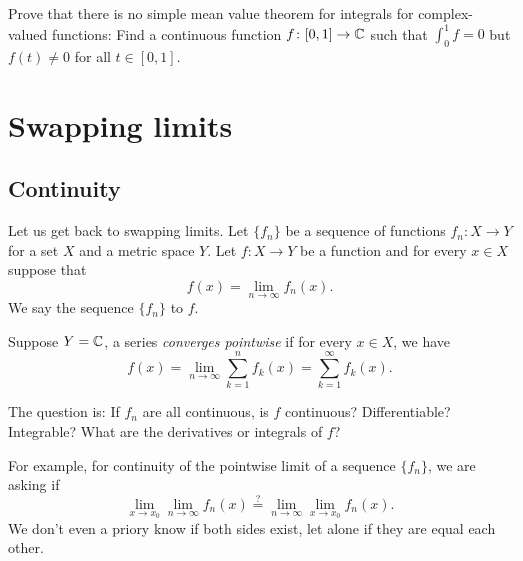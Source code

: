\begin{exercise}
Prove that there is no simple mean value theorem for integrals
for complex-valued
functions:  Find a continuous function $f \colon [0,1] \to {\mathbb{C}}$ such that
$\int_0^1 f = 0$ but $f(t) \not= 0$ for all $t \in [0,1]$.
\end{exercise}



\sectionnewpage
\section{Swapping limits}
\label{sec:swaplim}


\subsection{Continuity}

Let us get back to swapping limits.  Let $\{ f_n \}$ be a sequence
of functions $f_n \colon X \to Y$ for a set $X$ and a metric space $Y$.
Let $f \colon X \to Y$ be a
function and for every $x \in X$ suppose that
\begin{equation*}
f(x) = \lim_{n\to \infty} f_n(x) .
\end{equation*}
We say the sequence $\{ f_n \}$
\emph{} to $f$.

Suppose $Y={\mathbb{C}}$, a series
\emph{converges pointwise} if
for every $x \in X$, we have
\begin{equation*}
f(x) = \lim_{n\to \infty} \sum_{k=1}^n f_k(x) =
\sum_{k=1}^\infty f_k(x) .
\end{equation*}

\medskip

The question is:
If $f_n$ are all continuous, is $f$ continuous?  Differentiable?
Integrable?  What are the derivatives or integrals of $f$?

For example, for continuity of the pointwise limit of a sequence $\{ f_n
\}$, we are asking if
\begin{equation*}
\lim_{x\to x_0} \lim_{n\to\infty} f_n(x)
\overset{?}{=}
\lim_{n\to\infty} \lim_{x\to x_0} f_n(x) .
\end{equation*}
We don't even a priory know if both sides exist, let alone if they are equal each other.

